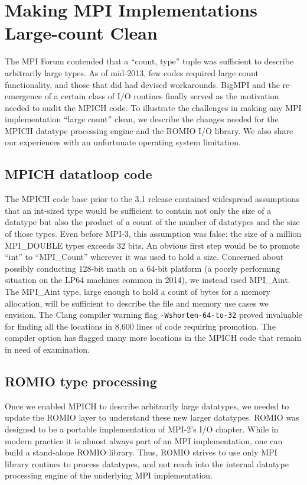 
\section{Making MPI Implementations Large-count Clean}
The MPI Forum contended that a ``count, type''
tuple was sufficient to describe arbitrarily large types.  As of mid-2013, few codes
required large count functionality, and those that did had devised workarounds.
BigMPI and the re-emergence of a certain class of I/O routines finally served
as the motivation needed to audit the MPICH code.  To illustrate the challenges in
making any MPI implementation ``large count'' clean, we describe the changes
needed for the MPICH datatype processing engine and the ROMIO I/O library. We
also share our experiences with an unfortunate operating system limitation.


\subsection{MPICH datatloop code}
The MPICH code base prior to the
3.1 release contained widespread assumptions that an int-sized type
would be sufficient to contain not only the size of a datatype but also the product
of a count of the number of datatypes and the size of those types.
Even before MPI-3, this assumption was false: the size of a million MPI\_DOUBLE
types exceeds 32 bits.
An obvious first step would be to promote ``int'' to ``MPI\_Count'' wherever it was
used to hold a size.
Concerned about possibly conducting 128-bit math on a 64-bit platform (a
poorly performing situation on the LP64 machines common in 2014),
we instead used MPI\_Aint.  The MPI\_Aint type, large enough to hold a
count of bytes for a memory allocation, will be sufficient to describe the file
and memory use cases we envision.
The Clang compiler warning flag
\texttt{-Wshorten-64-to-32} proved invaluable for finding
all the locations in 8,600 lines of
code requiring promotion.
The compiler option has
flagged many more
locations in the MPICH code that remain in need of examination.

\subsection{ROMIO type processing}
\label{sec:romio_typeproc}

Once we enabled MPICH to describe arbitrarily large datatypes, we
needed to update the ROMIO layer to understand these new larger datatypes.
ROMIO \cite{thakur:mpi-io-implement} was designed to be a portable
 implementation of MPI-2's I/O
chapter.  While in modern practice it is almost always part of an MPI
implementation, one can build a stand-alone ROMIO library.  Thus,
ROMIO strives to use only MPI library routines to process datatypes, and not reach into the internal datatype processing engine of the underlying MPI implementation.

